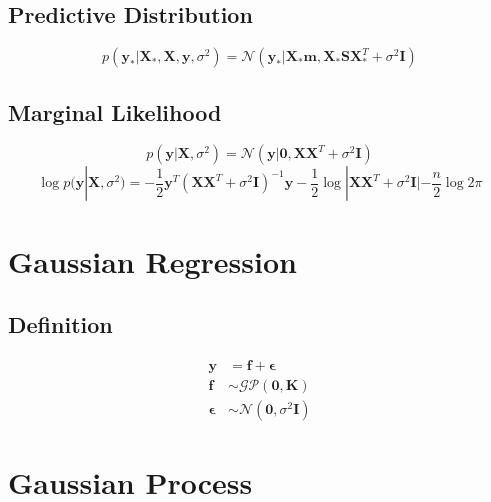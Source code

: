 \subsection[]{Predictive Distribution}
\begin{equation}
    p(\mathbf{y}_* | \mathbf{X}_*, \mathbf{X}, \mathbf{y}, \sigma^2) = \mathcal{N}(\mathbf{y}_* | \mathbf{X}_* \mathbf{m}, \mathbf{X}_* \mathbf{S} \mathbf{X}_*^T + \sigma^2 \mathbf{I})
\end{equation}


\subsection[]{Marginal Likelihood}
\begin{equation}
    p(\mathbf{y} | \mathbf{X}, \sigma^2) = \mathcal{N}(\mathbf{y} | \mathbf{0}, \mathbf{X} \mathbf{X}^T + \sigma^2 \mathbf{I})
\end{equation}
\begin{equation}
    \log p(\mathbf{y} | \mathbf{X}, \sigma^2) = - \frac{1}{2} \mathbf{y}^T (\mathbf{X} \mathbf{X}^T + \sigma^2 \mathbf{I})^{-1} \mathbf{y} - \frac{1}{2} \log |\mathbf{X} \mathbf{X}^T + \sigma^2 \mathbf{I}| - \frac{n}{2} \log 2 \pi
\end{equation}


\section{Gaussian Regression}

\subsection{Definition}
\begin{align}
    \mathbf{y} &= \mathbf{f} + \mathbf{\epsilon} \\
    \mathbf{f} &\sim \mathcal{GP}(\mathbf{0}, \mathbf{K}) \\
    \mathbf{\epsilon} &\sim \mathcal{N}(\mathbf{0}, \sigma^2 \mathbf{I})
\end{align}


\section{Gaussian Process}

